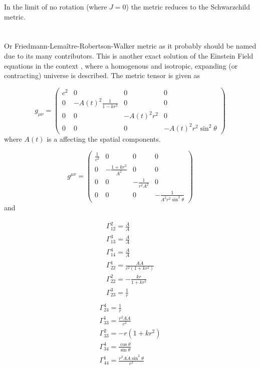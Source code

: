 In the limit of no rotation (where $J=0$) the metric reduces to the Schwarzchild metric.

\section{}

Or Friedmann-Lema\^itre-Robertson-Walker metric as it probably should be named due to its 
many contributors.  This is another exact solution of the Einstein Field equations in the context 
, where a homogenous and isotropic, expanding (or contracting) universe is 
described. The metric tensor is given as 

$$
 g_{\mu\nu} =   \begin{pmatrix}
    c^2 & 0 & 0 & 0 \\
    0 & -A(t)^2\frac{1}{1-kr^2} & 0 & 0 \\
    0 & 0 & -A(t)^2r^2 & 0 \\
    0 & 0 &  0 & -A(t)^2r^2\sin^2\theta
    \end{pmatrix}
$$
where $A(t)$ is a  affecting the spatial components.

$$
 g^{\mu\nu} =   \begin{pmatrix}
   \frac{1}{c^2} & 0 & 0 & 0\\
   0 & -\frac{1+kr^2}{A^2} & 0 & 0 \\
   0 & 0 & -\frac{1}{r^2A^2} & 0 \\
   0 & 0 & 0 & -\frac{1}{A^2r^2\sin^2\theta} 
  \end{pmatrix}
$$
and 

\begin{twocol}{
\begin{eqnarray*}
   \Gamma_{12}^2 = \frac{\dot{A}}{A} \\
   \Gamma_{13}^3 = \frac{\dot{A}}{A} \\
   \Gamma_{14}^4 = \frac{\dot{A}}{A} \\
   \Gamma_{22}^1 = \frac{A\dot{A}}{c^2(1+kr^2)} \\
   \Gamma_{22}^2 = -\frac{kr}{1+kr^2} \\
   \Gamma_{23}^3 = \frac{1}{r} \\
\end{eqnarray*}}{
\begin{eqnarray*}
   \Gamma_{24}^4 = \frac{1}{r} \\
   \Gamma_{33}^1 = \frac{r^2A\dot{A}}{c^2} \\
   \Gamma_{33}^2 = -r(1+kr^2) \\
   \Gamma_{34}^4 = \frac{\cos\theta}{\sin\theta} \\
   \Gamma_{44}^1 = \frac{r^2A\dot{A}\sin^2\theta}{c^2} \\
\end{eqnarray*}}
\end{twocol}

